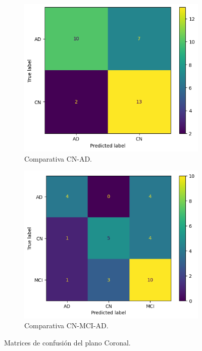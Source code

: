 \begin{figure}[H]
    \centering
    \begin{subfigure}{0.45\textwidth}
        \includegraphics[width=\textwidth]{./imgs/resultados/coronal/CN_AD_cm_CORONAL}
        \caption{Comparativa CN-AD. }
        \label{fig:mc-coronal-cn-ad}
    \end{subfigure}
    \hspace*{\fill}
    \begin{subfigure}{0.45\textwidth}
        \includegraphics[width=\textwidth]{./imgs/resultados/coronal/CN_MCI_AD_cm_CORONAL}
        \caption{Comparativa CN-MCI-AD. }
        \label{fig:mc-coronal-cn-mci-ad}
    \end{subfigure}
    \caption{Matrices de confusión del plano Coronal.} \label{fig:mc-coronal}
\end{figure}

